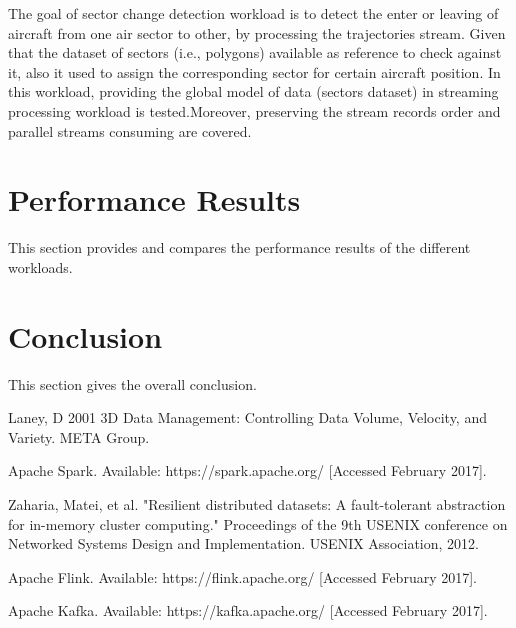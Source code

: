 \documentclass[]{article}
\begin{document}
The goal of sector change detection workload is to detect the  enter or leaving of aircraft from one air sector to other, by processing the trajectories stream. Given that the dataset of sectors (i.e., polygons) available as reference to  check against it, also it used to assign the corresponding sector for certain aircraft position. In this workload, providing the  global model of data (sectors dataset) in streaming processing workload is tested.Moreover, preserving the stream records order and parallel streams consuming are covered.
 
\section{Performance Results}

This section provides and compares the performance results of the different workloads.

\section{Conclusion}
This section gives the overall conclusion.


\begin{thebibliography}{[MT1]}
%
Laney, D 2001 3D Data Management: Controlling Data Volume, Velocity, and Variety. META Group.

Apache Spark. Available: https://spark.apache.org/ [Accessed February 2017].

Zaharia, Matei, et al. "Resilient distributed datasets: A fault-tolerant abstraction for in-memory cluster computing." Proceedings of the 9th USENIX conference on Networked Systems Design and Implementation. USENIX Association, 2012.

Apache Flink. Available: https://flink.apache.org/ [Accessed February 2017].

Apache Kafka. Available: https://kafka.apache.org/ [Accessed February 2017].


%
\end{thebibliography}
\end{document}
